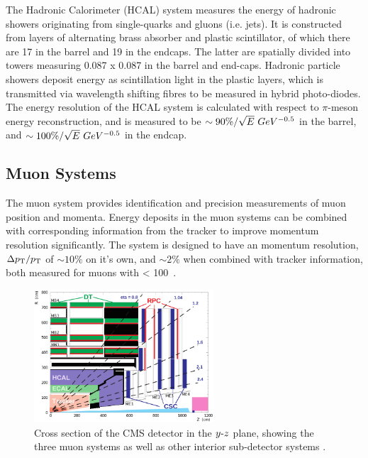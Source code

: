 The Hadronic Calorimeter (HCAL) system measures the energy of hadronic showers 
originating from single-quarks and gluons (i.e. jets). It is constructed from
layers of alternating brass absorber and plastic scintillator, of which there
are 17 in the barrel and 19 in the endcaps. The latter are spatially
divided into towers measuring 0.087 x 0.087 in the barrel and end-caps. Hadronic
particle showers deposit energy as scintillation light in the plastic layers,
which is transmitted via wavelength shifting fibres to be measured in hybrid
photo-diodes. The energy resolution of the HCAL system is calculated with
respect to $\pi$-meson energy reconstruction, and is measured to be
$\sim 90\%/\sqrt{E}~GeV^{-0.5}$ in the barrel, and $\sim 100\%/\sqrt{E}~GeV^{-0.5}$ in the endcap.

\subsection{Muon Systems}


The muon system provides identification and precision measurements of
muon position and momenta. Energy deposits in the muon systems can be combined
with corresponding information from the tracker to improve momentum resolution
significantly. The system is designed to have an momentum resolution,
$\Delta {p_{\text T}}/{p_{\text T}}$ of
$\sim10\%$ on it's own, and $\sim2\%$ when combined with tracker information,
both measured for muons with \Pt < 100~\gev.

\begin{figure}[ht!]
\centering
\includegraphics[width=0.6\textwidth]{Figs/machine/pictures_MuonSys-mod3.png}
\caption{Cross section of the CMS detector in the $y{\hbox{-}} z$ plane,
showing the three muon systems as well as other interior sub-detector systems
\cite{Bayatian:922757}.}
\label{fig:muon_system_diagram}
\end{figure}

